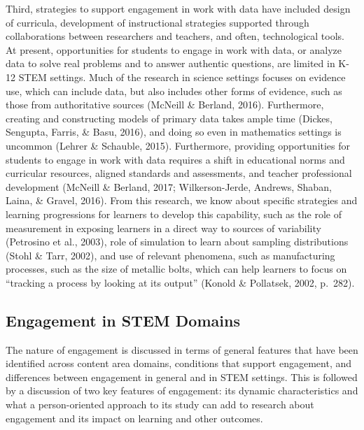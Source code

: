 \documentclass[]{msu-thesis}
\theoremstyle{definition}
\theoremstyle{definition}
\theoremstyle{definition}
\theoremstyle{remark}
\begin{document}
Third, strategies to support engagement in work with data have included
design of curricula, development of instructional strategies supported
through collaborations between researchers and teachers, and often,
technological tools. At present, opportunities for students to engage in
work with data, or analyze data to solve real problems and to answer
authentic questions, are limited in K-12 STEM settings. Much of the
research in science settings focuses on evidence use, which can include
data, but also includes other forms of evidence, such as those from
authoritative sources (McNeill \& Berland, 2016). Furthermore, creating
and constructing models of primary data takes ample time (Dickes,
Sengupta, Farris, \& Basu, 2016), and doing so even in mathematics
settings is uncommon (Lehrer \& Schauble, 2015). Furthermore, providing
opportunities for students to engage in work with data requires a shift
in educational norms and curricular resources, aligned standards and
assessments, and teacher professional development (McNeill \& Berland,
2017; Wilkerson-Jerde, Andrews, Shaban, Laina, \& Gravel, 2016). From
this research, we know about specific strategies and learning
progressions for learners to develop this capability, such as the role
of measurement in exposing learners in a direct way to sources of
variability (Petrosino et al., 2003), role of simulation to learn about
sampling distributions (Stohl \& Tarr, 2002), and use of relevant
phenomena, such as manufacturing processes, such as the size of metallic
bolts, which can help learners to focus on ``tracking a process by
looking at its output'' (Konold \& Pollatsek, 2002, p.~282).

\subsection{Engagement in STEM
Domains}\label{engagement-in-stem-domains}

The nature of engagement is discussed in terms of general features that
have been identified across content area domains, conditions that
support engagement, and differences between engagement in general and in
STEM settings. This is followed by a discussion of two key features of
engagement: its dynamic characteristics and what a person-oriented
approach to its study can add to research about engagement and its
impact on learning and other outcomes.
\end{document}
